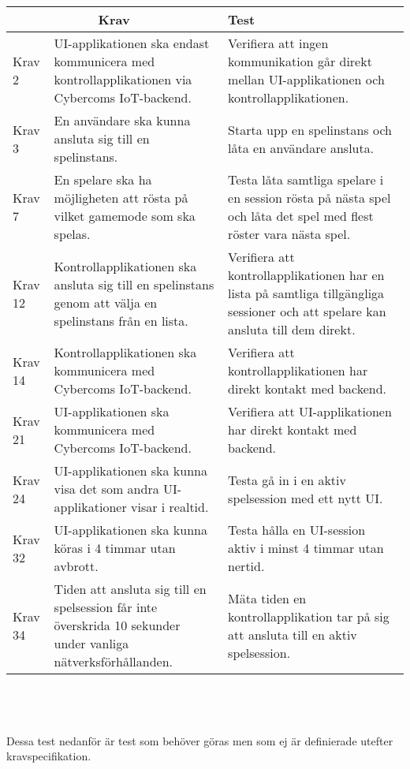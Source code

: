 	\begin{tabular}{| p{1.5cm} | p{6cm} | p{8cm}|}
	
  \hline
    \multicolumn{2}{|c|}{Krav}&{Test}\\
    \hline
		Krav 2&UI-applikationen ska endast kommunicera med kontrollapplikationen via Cybercoms IoT-backend.&Verifiera att ingen kommunikation går direkt mellan UI-applikationen och kontrollapplikationen.\\
		\hline
		Krav 3& En användare ska kunna ansluta sig till en spelinstans. &Starta upp en spelinstans och låta en användare ansluta. \\
		\hline
		Krav 7& En spelare ska ha möjligheten att rösta på vilket gamemode som ska spelas. & Testa låta samtliga spelare i en session rösta på nästa spel och låta det spel med flest röster vara nästa spel.\\
		\hline
		Krav 12& Kontrollapplikationen ska ansluta sig till en spelinstans genom att välja en spelinstans från en lista. & Verifiera att kontrollapplikationen har en lista på samtliga tillgängliga sessioner och att spelare kan ansluta till dem direkt. \\
		\hline
		Krav 14& Kontrollapplikationen ska kommunicera med Cybercoms IoT-backend. & Verifiera att kontrollapplikationen har direkt kontakt med backend. \\
		\hline
		Krav 21& UI-applikationen ska kommunicera med Cybercoms IoT-backend. & Verifiera att UI-applikationen har direkt kontakt med backend. \\
		\hline
		Krav 24& UI-applikationen ska kunna visa det som andra UI-applikationer visar i realtid. & Testa gå in i en aktiv spelsession med ett nytt UI. \\
		\hline
		Krav 32& UI-applikationen ska kunna köras i 4 timmar utan avbrott. & Testa hålla en UI-session aktiv i minst 4 timmar utan nertid. \\
		\hline
		Krav 34& Tiden att ansluta sig till en spelsession får inte överskrida 10 sekunder under vanliga nätverksförhållanden. & Mäta tiden en kontrollapplikation tar på sig att ansluta till en aktiv spelsession. \\
		\hline

   
  \end{tabular}
    \\  \\ \\
  Dessa test nedanför är test som behöver göras men som ej är definierade utefter kravspecifikation.
  \\
  
